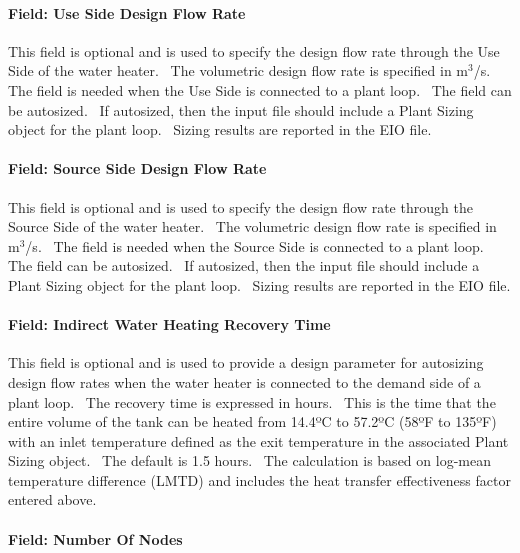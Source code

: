 \paragraph{Field: Use Side Design Flow Rate}\label{field-use-side-design-flow-rate-1-000}

This field is optional and is used to specify the design flow rate through the Use Side of the water heater.~ The volumetric design flow rate is specified in m\(^{3}\)/s.~ The field is needed when the Use Side is connected to a plant loop.~ The field can be autosized.~ If autosized, then the input file should include a Plant Sizing object for the plant loop.~ Sizing results are reported in the EIO file.

\paragraph{Field: Source Side Design Flow Rate}\label{field-source-side-design-flow-rate-1-000}

This field is optional and is used to specify the design flow rate through the Source Side of the water heater.~ The volumetric design flow rate is specified in m\(^{3}\)/s.~ The field is needed when the Source Side is connected to a plant loop.~ The field can be autosized.~ If autosized, then the input file should include a Plant Sizing object for the plant loop.~ Sizing results are reported in the EIO file.

\paragraph{Field: Indirect Water Heating Recovery Time}\label{field-indirect-water-heating-recovery-time-1}

This field is optional and is used to provide a design parameter for autosizing design flow rates when the water heater is connected to the demand side of a plant loop.~ The recovery time is expressed in hours.~ This is the time that the entire volume of the tank can be heated from 14.4ºC to 57.2ºC (58ºF to 135ºF) with an inlet temperature defined as the exit temperature in the associated Plant Sizing object.~ The default is 1.5 hours.~ The calculation is based on log-mean temperature difference (LMTD) and includes the heat transfer effectiveness factor entered above.

\paragraph{Field: Number Of Nodes}\label{field-number-of-nodes-000}

